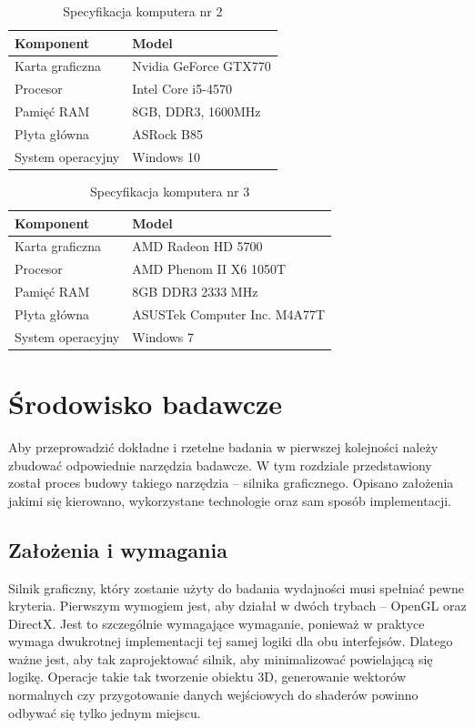 \documentclass[archive]{mgr}
\begin{document}
\begin{table}[!h]

    \centering 
    \caption{Specyfikacja komputera nr 2}
    		\label{lab:comps2}
    \vspace{2mm} 
\begin{tabular}{|l|l|}
\hline

\textbf{Komponent}&	\textbf{Model}\\ \hline
Karta graficzna & Nvidia GeForce GTX770  \\ \hline
Procesor & Intel Core i5-4570   \\ \hline
Pamięć RAM  & 8GB, DDR3, 1600MHz \\ \hline
Płyta główna & ASRock B85 \\ \hline
System operacyjny & Windows 10  \\ \hline
\end{tabular}
\end{table}

\begin{table}[!h]

    \centering 
    \caption{Specyfikacja komputera nr 3}
    		\label{lab:comps3}
    \vspace{2mm} 
\begin{tabular}{|l|l|}
\hline

\textbf{Komponent}&	\textbf{Model}\\ \hline
Karta graficzna& AMD Radeon HD 5700  \\ \hline
Procesor & AMD Phenom II X6 1050T  \\ \hline
Pamięć RAM & 8GB DDR3 2333 MHz \\ \hline
Płyta główna &  ASUSTek Computer Inc. M4A77T\\ \hline
System operacyjny & Windows 7  \\ \hline
\end{tabular}
\end{table}

\newpage
\section{Środowisko badawcze}
Aby przeprowadzić dokładne i rzetelne badania w pierwszej kolejności należy zbudować odpowiednie narzędzia badawcze. W tym rozdziale przedstawiony został proces budowy takiego narzędzia – silnika graficznego. Opisano założenia jakimi się kierowano, wykorzystane technologie oraz sam sposób implementacji.
\subsection{Założenia i wymagania}
Silnik graficzny, który zostanie użyty do badania wydajności musi spełniać pewne kryteria. Pierwszym wymogiem jest, aby działał w dwóch trybach – OpenGL oraz DirectX. Jest to szczególnie wymagające wymaganie, ponieważ w praktyce wymaga dwukrotnej implementacji tej samej logiki dla obu interfejsów. Dlatego ważne jest, aby tak zaprojektować silnik, aby minimalizować powielającą się logikę. Operacje takie tak tworzenie obiektu 3D, generowanie wektorów normalnych czy przygotowanie danych wejściowych do shaderów powinno odbywać się tylko jednym miejscu.
\\
\end{document}
